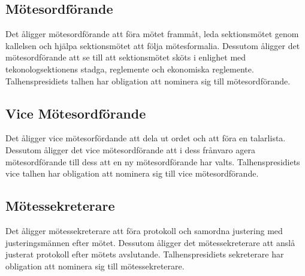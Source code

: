 \subsection{Mötesordförande}
Det åligger mötesordförande att föra mötet frammåt, leda sektionsmötet genom kallelsen och hjälpa sektionsmötet att följa mötesformalia.
Dessutom åligger det mötesordförande att se till att sektionsmötet sköts i enlighet med tekonologsektionens stadga, reglemente och ekonomiska reglemente.
Talhenspresidiets talhen har obligation att nominera sig till mötesordförande.
\subsection{Vice Mötesordförande}
Det åligger vice mötesorfördande att dela ut ordet och att föra en talarlista.
Dessutom åligger det vice mötesordförande att i dess frånvaro agera mötesordförande till dess att en ny mötesordförande har valts.
Talhenspresidiets vice talhen har obligation att nominera sig till vice mötesordförande.
\subsection{Mötessekreterare}
Det åligger mötessekreterare att föra protokoll och samordna justering med justeringsmännen efter mötet. 
Dessutom åligger det mötessekreterare att anslå justerat protokoll efter mötets avslutande.
Talhenspresidiets sekreterare har obligation att nominera sig till mötessekreterare.

\newpage

